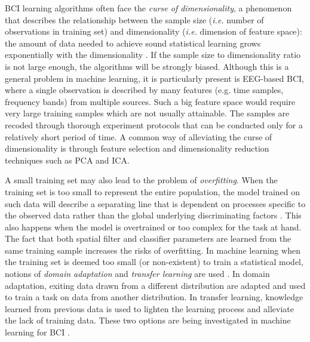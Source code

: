 BCI learning algorithms often face the \emph{curse of dimensionality}, a phenomenon that describes the relationship between the sample size (\textit{i.e.} number of observations in training set) and dimensionality (\textit{i.e.} dimension of feature space): the amount of data needed to achieve sound statistical learning grows exponentially with the dimensionality \citep{fukunaga_introduction_1990, foley_considerations_1972, kanal_dimensionality_1971, raudys_small_1991}. 
If the sample size to dimensionality ratio is not large enough, the algorithms will be strongly biased.
Although this is a general problem in machine learning, it is particularly present is EEG-based BCI, where a single observation is described by many features (e.g. time samples, frequency bands) from multiple sources.
Such a big feature space would require very large training samples which are not usually attainable.
The samples are recoded through thorough experiment protocols that can be conducted only for a relatively short period of time.
A common way of alleviating the curse of dimensionality is through feature selection and dimensionality reduction techniques such as PCA and ICA. 

A small training set may also lead to the problem of \emph{overfitting}. 
When the training set is too small to represent the entire population, the model trained on such data will describe a separating line that is dependent on processes specific to the observed data rather than the global underlying discriminating factors \citep{hill_classifying_2006}.
This also happens when the model is overtrained or too complex for the task at hand. 
The fact that both spatial filter and classifier parameters are learned from the same training sample increases the risks of overfitting.
In machine learning when the training set is deemed too small (or non-existent) to train a statistical model, notions of \emph{domain adaptation} and \emph{transfer learning} are used \citep{pan_survey_2010}. 
In domain adaptation, exiting data drawn from a different distribution are adapted and used to train a task on data from another distribution. 
In transfer learning, knowledge learned from previous data is used to lighten the learning process and alleviate the lack of training data.
These two options are  being investigated in machine learning for BCI \citep{kang_composite_2009, wang_review_2015}.    

 

